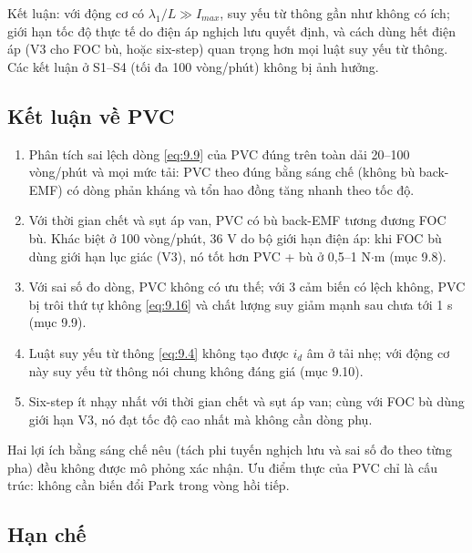 Kết luận: với động cơ có $\lambda_1/L \gg I_{max}$, suy yếu từ thông gần như không có ích; giới hạn tốc độ thực tế do điện áp nghịch lưu quyết định, và cách dùng hết điện áp (V3 cho FOC bù, hoặc six-step) quan trọng hơn mọi luật suy yếu từ thông. Các kết luận ở S1–S4 (tối đa 100 vòng/phút) không bị ảnh hưởng.

\subsection{Kết luận về PVC}\label{sec:9.11}

\begin{enumerate}[leftmargin=*]
\item Phân tích sai lệch dòng \eqref{eq:9.9} của PVC đúng trên toàn dải 20–100 vòng/phút và mọi mức tải: PVC theo đúng bằng sáng chế (không bù back-EMF) có dòng phản kháng và tổn hao đồng tăng nhanh theo tốc độ.
\item Với thời gian chết và sụt áp van, PVC có bù back-EMF tương đương FOC bù. Khác biệt ở 100 vòng/phút, 36 V do bộ giới hạn điện áp: khi FOC bù dùng giới hạn lục giác (V3), nó tốt hơn PVC + bù ở 0,5–1 N$\cdot$m (mục 9.8).
\item Với sai số đo dòng, PVC không có ưu thế; với 3 cảm biến có lệch không, PVC bị trôi thứ tự không \eqref{eq:9.16} và chất lượng suy giảm mạnh sau chưa tới 1 s (mục 9.9).
\item Luật suy yếu từ thông \eqref{eq:9.4} không tạo được $i_d$ âm ở tải nhẹ; với động cơ này suy yếu từ thông nói chung không đáng giá (mục 9.10).
\item Six-step ít nhạy nhất với thời gian chết và sụt áp van; cùng với FOC bù dùng giới hạn V3, nó đạt tốc độ cao nhất mà không cần dòng phụ.
\end{enumerate}

Hai lợi ích bằng sáng chế nêu (tách phi tuyến nghịch lưu và sai số đo theo từng pha) đều không được mô phỏng xác nhận. Ưu điểm thực của PVC chỉ là cấu trúc: không cần biến đổi Park trong vòng hồi tiếp.

\subsection{Hạn chế}\label{sec:9.12}


